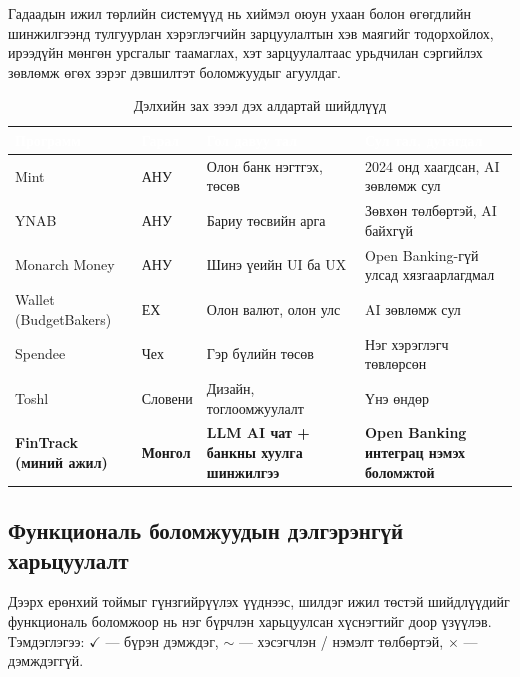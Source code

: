 Гадаадын ижил төрлийн системүүд нь хиймэл оюун ухаан болон өгөгдлийн шинжилгээнд тулгуурлан хэрэглэгчийн зарцуулалтын хэв маягийг тодорхойлох, ирээдүйн мөнгөн урсгалыг таамаглах, хэт зарцуулалтаас урьдчилан сэргийлэх зөвлөмж өгөх зэрэг дэвшилтэт боломжуудыг агуулдаг.

\begin{table}[ht]
\centering
\footnotesize
\renewcommand{\arraystretch}{1.25}
\begin{tabular}{|p{2.4cm}|p{2.6cm}|p{3cm}|p{4cm}|}
\hline
\rowcolor{darknavy}
\textcolor{white}{\textbf{Программ}} & \textcolor{white}{\textbf{Гарал}} & \textcolor{white}{\textbf{Гол давуу тал}} & \textcolor{white}{\textbf{Сул тал, дутагдал}} \\ \hline
Mint            & АНУ          & Олон банк нэгтгэх, төсөв        & 2024 онд хаагдсан, AI зөвлөмж сул \\ \hline
YNAB            & АНУ          & Бариу төсвийн арга              & Зөвхөн төлбөртэй, AI байхгүй \\ \hline
Monarch Money   & АНУ          & Шинэ үеийн UI ба UX                & Open Banking-гүй улсад хязгаарлагдмал \\ \hline
Wallet (BudgetBakers) & ЕХ      & Олон валют, олон улс            & AI зөвлөмж сул \\ \hline
Spendee         & Чех          & Гэр бүлийн төсөв                & Нэг хэрэглэгч төвлөрсөн \\ \hline
Toshl           & Словени      & Дизайн, тоглоомжуулалт          & Үнэ өндөр \\ \hline
\textbf{FinTrack (миний ажил)} & \textbf{Монгол} & \textbf{LLM AI чат + банкны хуулга шинжилгээ} & \textbf{Open Banking интеграц нэмэх боломжтой} \\ \hline
\end{tabular}
\caption{Дэлхийн зах зээл дэх алдартай шийдлүүд}
\label{tab:competitors}
\end{table}

\subsection{Функциональ боломжуудын дэлгэрэнгүй харьцуулалт}
Дээрх ерөнхий тоймыг гүнзгийрүүлэх үүднээс, шилдэг ижил төстэй шийдлүүдийг функциональ боломжоор нь нэг бүрчлэн харьцуулсан хүснэгтийг доор үзүүлэв. Тэмдэглэгээ: $\checkmark$ --- бүрэн дэмждэг, $\sim$ --- хэсэгчлэн / нэмэлт төлбөртэй, $\times$ --- дэмждэггүй.

